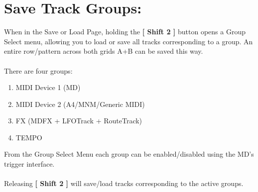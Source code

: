 \section{Save Track Groups:}
When in the Save or Load Page, holding the \textbf{[ Shift 2 ]} button opens a Group Select menu,
allowing you to load or save all tracks corresponding to a group. An entire row/pattern across both grids A+B can be saved this way.\\
\\
There are four groups:
\begin{enumerate}
    \item MIDI Device 1 (MD)
    \item MIDI Device 2 (A4/MNM/Generic MIDI)
    \item FX (MDFX + LFOTrack + RouteTrack)
    \item TEMPO
\end{enumerate}
From the Group Select Menu each group can be enabled/disabled using the MD's trigger interface.\\
\\
Releasing \textbf{[ Shift 2 ]} will save/load tracks corresponding to the active groups.


